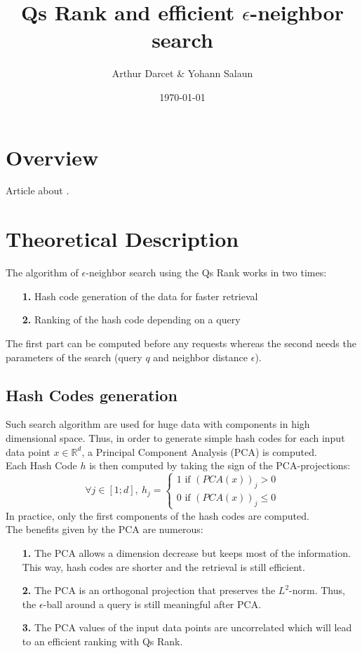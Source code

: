 \documentclass{article}
\title{Qs Rank and efficient $\epsilon$-neighbor search}
\author{Arthur Darcet \& Yohann Salaun}
\date{\today}
\begin{document}
\maketitle

\section{Overview}

Article about \citep{QSRank}.

\section{Theoretical Description}

The algorithm of $\epsilon$-neighbor search using the Qs Rank works in two times:
\begin{itemize}
	\item[\textbf{1.}] Hash code generation of the data for faster retrieval
	\item[\textbf{2.}] Ranking of the hash code depending on a query
\end{itemize}
The first part can be computed before any requests whereas the second needs the parameters of the search (query $q$ and neighbor distance $\epsilon$).

\subsection{Hash Codes generation}

Such search algorithm are used for huge data with components in high dimensional space. Thus, in order to generate simple hash codes for each input data point $x \in \mathbb{R}^d$, a Principal Component Analysis (PCA) is computed.\\
Each Hash Code $h$ is then computed by taking the sign of the PCA-projections:
\[	
\forall j \in [1;d],\ h_j = 	
 	\left \{
		\begin{array}{c}
    		1 \text{ if }(PCA(x))_j > 0 \\
    		0 \text{ if }(PCA(x))_j \leq 0
		\end{array}
	\right.
\]
In practice, only the first components of the hash codes are computed.\\
The benefits given by the PCA are numerous:
\begin{itemize}
	\item[\textbf{1.}] The PCA allows a dimension decrease but keeps most of the information. This way, hash codes are shorter and the retrieval is still efficient.
	\item[\textbf{2.}] The PCA is an orthogonal projection that preserves the $L^2$-norm. Thus, the $\epsilon$-ball around a query is still meaningful after PCA.
	\item[\textbf{3.}] The PCA values of the input data points are uncorrelated which will lead to an efficient ranking with Qs Rank.
\end{itemize}
\end{document}

